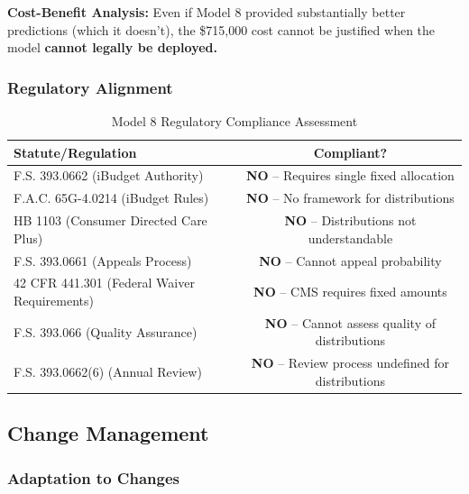 \textbf{Cost-Benefit Analysis:} Even if Model 8 provided substantially better predictions (which it doesn't), the \$715,000 cost cannot be justified when the model \textbf{cannot legally be deployed.}

\subsubsection{Regulatory Alignment}

\begin{table}[h]
\centering
\caption{Model 8 Regulatory Compliance Assessment}
\begin{tabular}{lc}
\toprule
\textbf{Statute/Regulation} & \textbf{Compliant?} \\
\midrule
F.S. 393.0662 (iBudget Authority) & \textbf{NO} -- Requires single fixed allocation \\
F.A.C. 65G-4.0214 (iBudget Rules) & \textbf{NO} -- No framework for distributions \\
HB 1103 (Consumer Directed Care Plus) & \textbf{NO} -- Distributions not understandable \\
F.S. 393.0661 (Appeals Process) & \textbf{NO} -- Cannot appeal probability \\
42 CFR 441.301 (Federal Waiver Requirements) & \textbf{NO} -- CMS requires fixed amounts \\
F.S. 393.066 (Quality Assurance) & \textbf{NO} -- Cannot assess quality of distributions \\
F.S. 393.0662(6) (Annual Review) & \textbf{NO} -- Review process undefined for distributions \\
\bottomrule
\end{tabular}
\end{table}




\subsection{Change Management}

\subsubsection{Adaptation to Changes}

